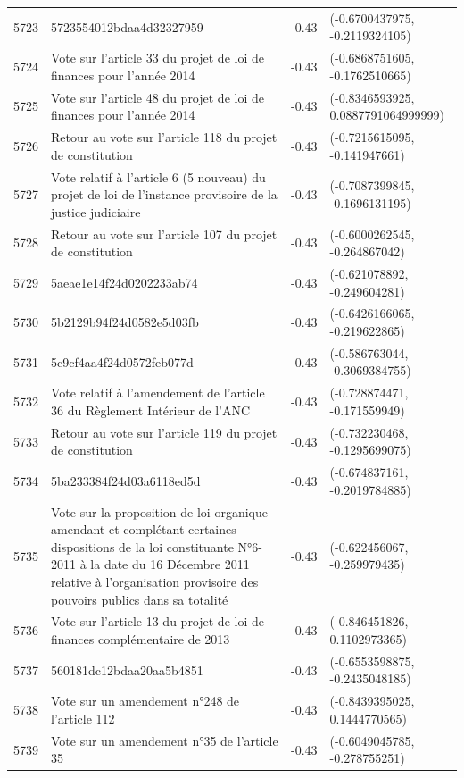 \begin{table}[ht]
\begin{tabular}{rlrl}
  5723 & 5723554012bdaa4d32327959 & -0.43 & (-0.6700437975, -0.2119324105) \\ 
  5724 & Vote sur l'article 33 du projet de loi de finances pour l'année 2014 & -0.43 & (-0.6868751605, -0.1762510665) \\ 
  5725 & Vote sur l'article 48 du projet de loi de finances pour l'année 2014 & -0.43 & (-0.8346593925, 0.0887791064999999) \\ 
  5726 & Retour au vote sur l'article 118 du projet de constitution & -0.43 & (-0.7215615095, -0.141947661) \\ 
  5727 & Vote relatif à l'article 6 (5 nouveau) du projet de loi de l'instance provisoire de la justice judiciaire & -0.43 & (-0.7087399845, -0.1696131195) \\ 
  5728 & Retour au vote sur l'article 107 du projet de constitution & -0.43 & (-0.6000262545, -0.264867042) \\ 
  5729 & 5aeae1e14f24d0202233ab74 & -0.43 & (-0.621078892, -0.249604281) \\ 
  5730 & 5b2129b94f24d0582e5d03fb & -0.43 & (-0.6426166065, -0.219622865) \\ 
  5731 & 5c9cf4aa4f24d0572feb077d & -0.43 & (-0.586763044, -0.3069384755) \\ 
  5732 & Vote relatif à l'amendement de l'article 36 du Règlement Intérieur de l'ANC & -0.43 & (-0.728874471, -0.171559949) \\ 
  5733 & Retour au vote sur l'article 119 du projet de constitution & -0.43 & (-0.732230468, -0.1295699075) \\ 
  5734 & 5ba233384f24d03a6118ed5d & -0.43 & (-0.674837161, -0.2019784885) \\ 
  5735 & Vote sur la proposition de loi organique amendant et complétant certaines dispositions de la loi constituante N°6-2011 à la date du 16 Décembre 2011 relative à l'organisation provisoire des pouvoirs publics dans sa totalité & -0.43 & (-0.622456067, -0.259979435) \\ 
  5736 & Vote sur l'article 13 du projet de loi de finances complémentaire de 2013 & -0.43 & (-0.846451826, 0.1102973365) \\ 
  5737 & 560181dc12bdaa20aa5b4851 & -0.43 & (-0.6553598875, -0.2435048185) \\ 
  5738 & Vote sur un amendement n°248 de l'article 112 & -0.43 & (-0.8439395025, 0.1444770565) \\ 
  5739 & Vote sur un amendement n°35 de l'article 35 & -0.43 & (-0.6049045785, -0.278755251) \\ 

\end{tabular}
\end{table}
